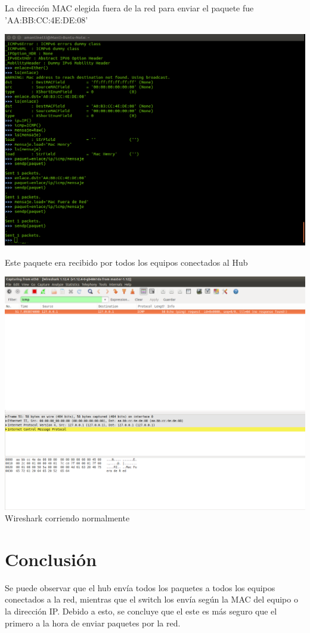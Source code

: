 \documentclass[spanish]{udpreport}
\begin{document}
La dirección MAC elegida fuera de la red para enviar el paquete fue 'AA:BB:CC:4E:DE:08'

\begin{center}
	\includegraphics[scale=.27]{imagenes/Hub/consoleout.png}
\end{center}

Este paquete era recibido por todos los equipos conectados al Hub

\begin{center}
	\includegraphics[scale=.27]{imagenes/Hub/wireout.png}
	\\ Wireshark corriendo normalmente 
\end{center}

\chapter{Conclusión}
Se puede observar que el hub envía todos los paquetes a todos los equipos conectados a la red, mientras que el switch los  envía según la MAC del equipo o la dirección IP. Debido a esto, se concluye que el este es más seguro que el primero a la hora de enviar paquetes por la red.
\end{document}
